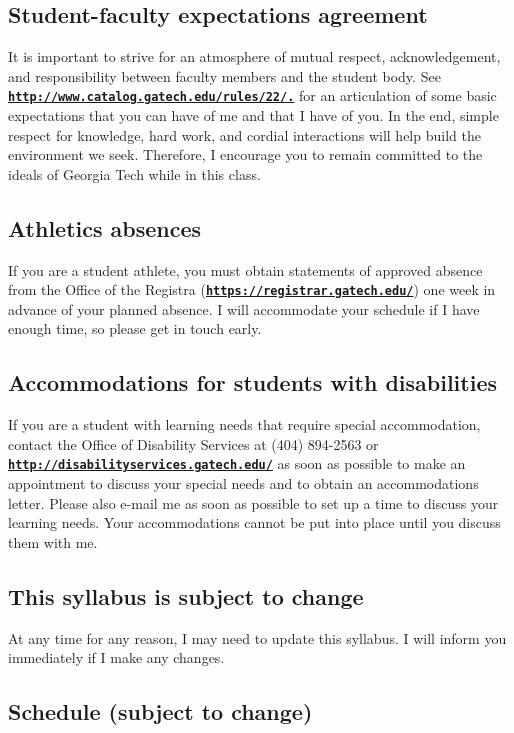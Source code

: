 \documentclass[11pt]{article}
\begin{document}
\subsection*{Student-faculty expectations agreement}
It   is   important   to   strive   for   an   atmosphere   of   mutual   respect,   acknowledgement,   and
responsibility   between   faculty   members   and   the   student   body.   See
\href{http://www.catalog.gatech.edu/rules/22/.}{\tt\bf http://www.catalog.gatech.edu/rules/22/.} 
 for an articulation of some basic expectations that you
can have of me and that I have of you. In the end, simple respect for knowledge, hard work, and
cordial   interactions   will   help   build   the   environment   we   seek.   Therefore,   I   encourage   you   to
remain committed to the ideals of Georgia Tech while in this class.
\subsection*{Athletics absences}
If you are a student athlete, you must obtain statements of approved absence from the Office of
the Registra (\href{https://registrar.gatech.edu/}{\tt\bf https://registrar.gatech.edu/}) one week in advance of your planned absence.  I will
accommodate your schedule if I have enough time, so please get in touch early.
\subsection*{Accommodations for students with disabilities}
If you are a student with learning needs that require special accommodation, contact the Office
of   Disability   Services   at   (404)   894-2563   or \href{http://disabilityservices.gatech.edu/}{\tt\bf http://disabilityservices.gatech.edu/}    as   soon   as
possible to make an appointment to discuss your special needs and to obtain an accommodations
letter.  Please also e-mail me as soon as possible to set up a time to discuss your learning needs.
Your accommodations cannot be put into place until you discuss them with me. 
\subsection*{This syllabus is subject to change}
At any time for any reason, I may need to update this syllabus.  I will inform you immediately if
I make any changes.


\subsection*{Schedule (subject to change)}
\end{document}
